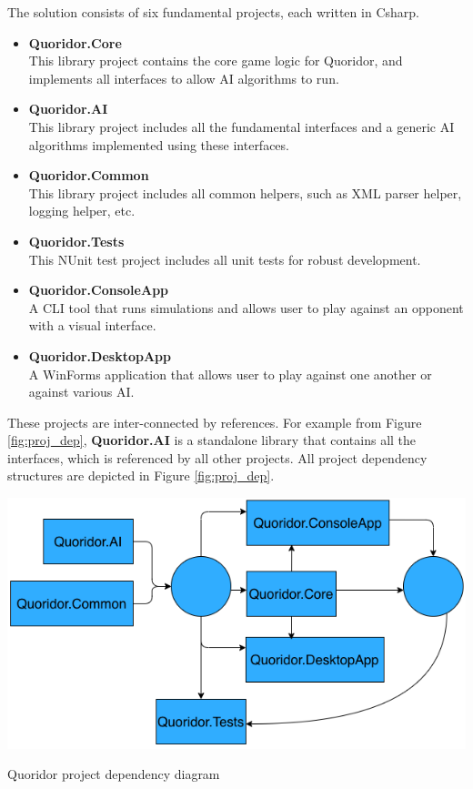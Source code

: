 The solution consists of six fundamental projects, each written in \gls{Csharp}.

\begin{itemize}
    \item \textbf{Quoridor.Core}\\
        This library project contains the core game logic for Quoridor, and implements all interfaces to allow \gls{AI} algorithms to run.
        
    \item \textbf{Quoridor.AI}\\
        This library project includes all the fundamental interfaces and a generic \gls{AI} algorithms implemented using these interfaces.

    \item \textbf{Quoridor.Common}\\
        This library project includes all common helpers, such as XML parser helper, logging helper, etc.

    \item \textbf{Quoridor.Tests}\\
        This NUnit test project includes all unit tests for robust development.

    \item \textbf{Quoridor.ConsoleApp}\\
        A CLI tool that runs simulations and allows user to play against an opponent with a visual interface.

    \item \textbf{Quoridor.DesktopApp}\\
        A WinForms application that allows user to play against one another or against various \gls{AI}.
\end{itemize}

These projects are inter-connected by references. For example from Figure \ref{fig:proj_dep}, \textbf{Quoridor.AI} is a standalone library that contains all the interfaces, which is referenced by all other projects.
All project dependency structures are depicted in Figure \ref{fig:proj_dep}.

\begin{Figure}[!ht]
    \centering
    \includegraphics[width=.95\linewidth]{../img/project_structure.png}
    \caption{Quoridor project dependency diagram}
    \label{fig:proj_dep}
\end{Figure}